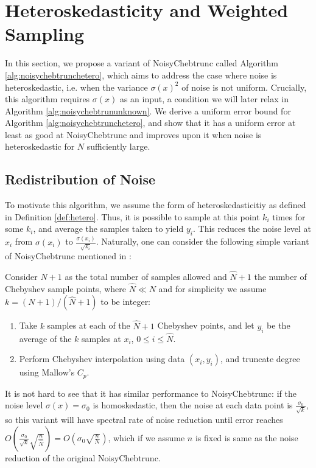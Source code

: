 \documentclass[pdflatex,sn-mathphys-num]{sn-jnl}%
\theoremstyle{thmstyleone}%
\theoremstyle{thmstyletwo}%
\theoremstyle{thmstylethree}%
\begin{document}
\section{Heteroskedasticity and Weighted Sampling}\label{sec:noisy-hetero}

In this section, we propose a variant of NoisyChebtrunc called Algorithm \ref{alg:noisychebtrunchetero},  which aims to address the case where noise is heteroskedastic, i.e. when the variance $ \sigma(x)^2 $ of noise is not uniform. Crucially, this algorithm requires $ \sigma(x) $ as an input, a condition we will later relax in Algorithm \ref{alg:noisychebtrununknown}. We derive a uniform error bound for Algorithm \ref{alg:noisychebtrunchetero}, and show that it has a uniform error at least as good at NoisyChebtrunc and improves upon it when noise is heteroskedastic for $N$ sufficiently large. 


\subsection{Redistribution of Noise}
To motivate this algorithm, we assume the form of heteroskedasticitiy as defined in Definition \ref{def:hetero}. Thus, it is possible to sample at this point $k_i$ times for some $k_i$, and average the samples taken to yield $y_i$. This reduces the noise level at $x_i$ from $\sigma(x_i)$ to $\frac{\sigma(x_i)}{\sqrt{k_i}}$. Naturally, one can consider the following simple variant of NoisyChebtrunc mentioned in \cite{yuji}:

Consider $N+1$ as the total number of samples allowed and $\hat{N}+1$ the number of Chebyshev sample points, where $\hat{N} \ll N$ and for simplicity we assume $k = (N+1)/(\hat{N}+1)$ to be integer:


\begin{enumerate}
	\item Take $k$ samples at each of the $\hat{N}+1$ Chebyshev points, and let $y_i$ be the average of the $k$ samples at $x_i$, $0\leq i\leq \hat{N}$.
	\item Perform Chebyshev interpolation using data $(x_i,y_i)$, and truncate degree using Mallow's $C_p$.
\end{enumerate}

It is not hard to see that it has similar performance to NoisyChebtrunc: if the noise level $\sigma(x) = \sigma_0$ is homoskedastic, then the noise at each data point is $\frac{\sigma_0}{\sqrt{k}}$, so this variant will have spectral rate of noise reduction until error reaches $O(\frac{\sigma_0}{\sqrt{k}}\sqrt{\frac{n}{\hat{N}}}) = O(\sigma_0\sqrt{\frac{n}{N}})$, which if we assume $n$ is fixed is same as the noise reduction of the original NoisyChebtrunc. 
\end{document}
